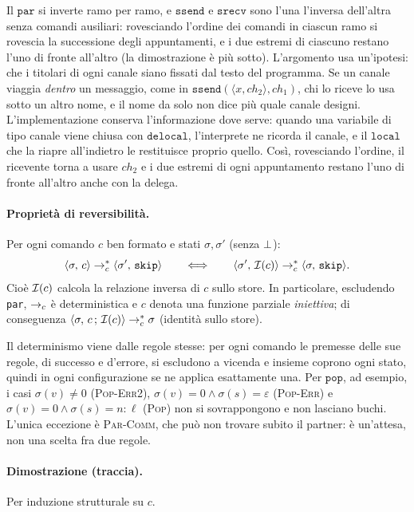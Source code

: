 \smallskip
\noindent
Il $\mathtt{par}$ si inverte ramo per ramo, e $\mathtt{ssend}$ e
$\mathtt{srecv}$ sono l'una l'inversa dell'altra senza comandi ausiliari:
rovesciando l'ordine dei comandi in ciascun ramo si rovescia la successione
degli appuntamenti, e i due estremi di ciascuno restano l'uno di fronte
all'altro (la dimostrazione è più sotto). L'argomento usa un'ipotesi: che i
titolari di ogni canale siano fissati dal testo del programma. Se un canale
viaggia \emph{dentro} un messaggio, come in $\mathtt{ssend}(\langle x,
\mathit{ch}_2\rangle, \mathit{ch}_1)$, chi lo riceve lo usa sotto un altro nome,
e il nome da solo non dice più quale canale designi. L'implementazione
conserva l'informazione dove serve: quando una variabile di tipo canale viene
chiusa con $\mathtt{delocal}$, l'interprete ne ricorda il canale, e il
$\mathtt{local}$ che la riapre all'indietro le restituisce proprio quello. Così,
rovesciando l'ordine, il ricevente torna a usare $\mathit{ch}_2$ e i due
estremi di ogni appuntamento restano l'uno di fronte all'altro anche con la
delega.

\paragraph{Proprietà di reversibilità.}
Per ogni comando $c$ ben formato e stati $\sigma, \sigma'$ (senza $\err$):
\[
\cfg{c}{\sigma} \toc^{*} \cfg{\mathtt{skip}}{\sigma'}
\qquad\Longleftrightarrow\qquad
\cfg{\Inv{c}}{\sigma'} \toc^{*} \cfg{\mathtt{skip}}{\sigma} .
\]
Cioè $\Inv{c}$ calcola la relazione inversa di $c$ sullo store. In particolare,
escludendo \texttt{par}, $\toc$ è deterministica e $c$ denota una funzione
parziale \emph{iniettiva}; di conseguenza
$\cfg{c\,;\,\Inv{c}}{\sigma} \toc^{*} \sigma$ (identità sullo store).

Il determinismo viene dalle regole stesse: per ogni comando le premesse delle sue
regole, di successo e d'errore, si escludono a vicenda e insieme coprono ogni
stato, quindi in ogni configurazione se ne applica esattamente una. Per
$\mathtt{pop}$, ad esempio, i casi $\sigma(v) \neq 0$
(\textcolor{red!60!black}{\textsc{Pop-Err2}}), $\sigma(v) = 0 \land \sigma(s) =
\varepsilon$ (\textcolor{red!60!black}{\textsc{Pop-Err}}) e $\sigma(v) = 0 \land
\sigma(s) = n : \ell$ (\textsc{Pop}) non si sovrappongono e non lasciano buchi.
L'unica eccezione è \textsc{Par-Comm}, che può non trovare subito il partner: è
un'attesa, non una scelta fra due regole.

\paragraph{Dimostrazione (traccia).} Per induzione strutturale su $c$.

